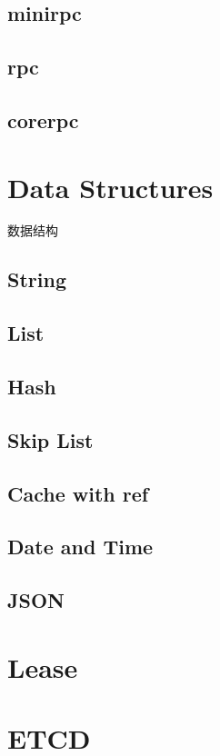 \subsection{minirpc}
\subsection{rpc}
\subsection{corerpc}

\section{Data Structures}

数据结构

\subsection{String}
\subsection{List}
\subsection{Hash}
\subsection{Skip List}
\subsection{Cache with ref}
\subsection{Date and Time}
\subsection{JSON}

\section{Lease}
\section{ETCD}
